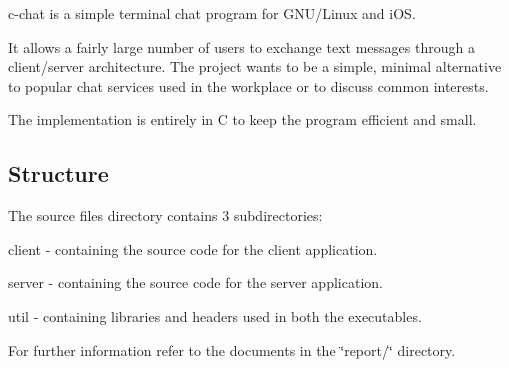 c-\/chat is a simple terminal chat program for G\+N\+U/\+Linux and i\+OS.

It allows a fairly large number of users to exchange text messages through a client/server architecture. The project wants to be a simple, minimal alternative to popular chat services used in the workplace or to discuss common interests.

The implementation is entirely in C to keep the program efficient and small.

\subsection*{Structure}

The source files directory contains 3 subdirectories\+:


\begin{DoxyItemize}
\item client -\/ containing the source code for the client application.
\item server -\/ containing the source code for the server application.
\item util -\/ containing libraries and headers used in both the executables.
\end{DoxyItemize}

For further information refer to the documents in the \char`\"{}report/\char`\"{} directory. 
